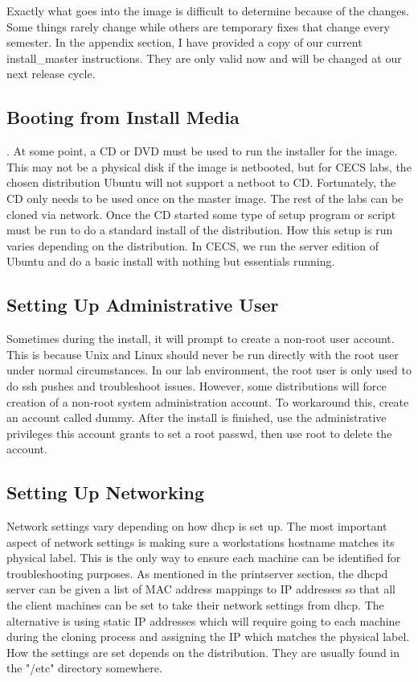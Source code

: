 Exactly what goes into the image is difficult to determine because of the changes. Some things rarely change while others are temporary fixes that change every semester. In the appendix section, I have provided a copy of our current install\_master instructions. They are only valid now and will be changed at our next release cycle. 

\subsection{Booting from Install Media}.
At some point, a CD or DVD must be used to run the installer for the image.  This may not be a physical disk if the image is netbooted, but for CECS labs, the chosen distribution Ubuntu will not support a netboot to CD.  Fortunately, the CD only needs to be used once on the master image.  The rest of the labs can be cloned via network.  Once the CD started some type of setup program or script must be run to do a standard install of the distribution.  How this setup is run varies depending on the distribution.  In CECS, we run the server edition of Ubuntu and do a basic install with nothing but essentials running.  

\subsection{Setting Up Administrative User}
Sometimes during the install, it will prompt to create a non-root user account.  This is because Unix and Linux should never be run directly with the root user under normal circumstances.  In our lab environment, the root user is only used to do ssh pushes and troubleshoot issues.  However, some distributions will force creation of a non-root system administration account.  To workaround this, create an account called dummy.  After the install is finished, use the administrative privileges this account grants to set a root passwd, then use root to delete the account.  

\subsection{Setting Up Networking}
Network settings vary depending on how dhcp is set up.  The most important aspect of network settings is making sure a workstations hostname matches its physical label.  This is the only way to ensure each machine can be identified for troubleshooting purposes.  As mentioned in the printserver section, the dhcpd server can be given a list of MAC address mappings to IP addresses so that all the client machines can be set to take their network settings from dhcp.  The alternative is using static IP addresses which will require going to each machine during the cloning process and assigning the IP which matches the physical label.  How the settings are set depends on the distribution.  They are usually found in the "/etc" directory somewhere.  

